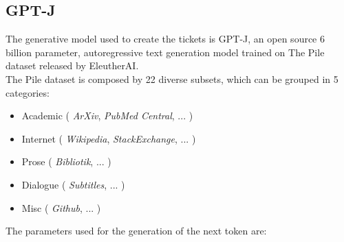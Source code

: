 \documentclass{article}
\begin{document}
\subsection{GPT-J}
The generative model used to create the tickets is GPT-J, an open source 6 billion parameter, autoregressive text generation model trained on The Pile dataset released by EleutherAI. \\
The Pile dataset is composed by 22 diverse subsets, which can be grouped in 5 categories:
\begin{itemize}
    \item Academic ( \textit{ArXiv}, \textit{PubMed Central}, ... )
    \item Internet ( \textit{Wikipedia}, \textit{StackExchange}, ... )
    \item Prose ( \textit{Bibliotik}, ... )
    \item Dialogue ( \textit{Subtitles}, ... )
    \item Misc ( \textit{Github}, ... )
\end{itemize}
The parameters used for the generation of the next token are:
\end{document}
